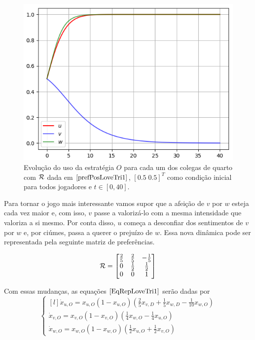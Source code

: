 \begin{figure}[h]
    \caption{Evolução do uso da estratégia $O$ para cada um dos colegas de quarto com $\mathcal{R}$ dada em $\eqref{prefPosLoveTri1}$,  $[0.5 \; 0.5]^T$ como condição inicial para todos jogadores e $t\in[0,40]$.}
    \centerline{\includegraphics[scale=0.8]{./img/love_tri1.png}}
    \label{fig:love_tri1.png}
\end{figure}

Para tornar o jogo mais interessante vamos supor que a afeição de $v$ por $w$ esteja cada vez maior e, com isso, $v$ passe a valorizá-lo com a mesma intensidade que valoriza a si mesmo. Por conta disso, $u$ começa a desconfiar dos sentimentos de $v$ por $w$ e, por ciúmes, passa a querer o prejuízo de $w$. Essa nova dinâmica pode ser representada pela seguinte matriz de preferências.

\begin{equation}
    \label{prefPosLoveTri2}
    \mathcal{R}=
    \begin{bmatrix}
        \frac{2}{5} & \frac{2}{5} & -\frac{1}{5}\\ 
        0 & \frac{1}{2} & \frac{1}{2} \\
        0 & 0 & 1
    \end{bmatrix}
\end{equation}

Com essas mudanças, as equações $\eqref{EqRepLoveTri1}$ serão dadas por
\begin{equation}
    \label{EqRepLoveTri2}
    \left\{\begin{matrix*}[l]
        \dot{x}_{u,O}=x_{u,O}(1-x_{u,O})\left(\frac{2}{5}x_{v,D}+\frac{1}{5}x_{w,D} -\frac{1}{10}x_{w,O}\right) \\
        \dot{x}_{v,O}=x_{v,O}(1-x_{v,O})\left(\frac{1}{4}x_{w,O}-\frac{1}{4}x_{u,O}\right) \\
        \dot{x}_{w,O}=x_{w,O}(1-x_{w,O})\left(\frac{1}{2}x_{u,O}+\frac{1}{2}x_{v,O}\right)
    \end{matrix*}\right.
\end{equation}

